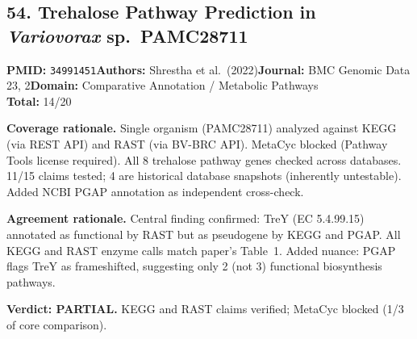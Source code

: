 \subsection{54. Trehalose Pathway Prediction in \textit{Variovorax} sp.\ PAMC28711}
\textbf{PMID:} \texttt{34991451}\quad\textbf{Authors:} Shrestha et al.\ (2022)\quad\textbf{Journal:} BMC Genomic Data 23, 2\quad\textbf{Domain:} Comparative Annotation / Metabolic Pathways\\
\quad{}\quad\textbf{Total:} 14/20\par\smallskip
\noindent\textbf{Coverage rationale.} Single organism (PAMC28711) analyzed against KEGG (via REST API) and RAST (via BV-BRC API). MetaCyc blocked (Pathway Tools license required). All 8 trehalose pathway genes checked across databases. 11/15 claims tested; 4 are historical database snapshots (inherently untestable). Added NCBI PGAP annotation as independent cross-check.\par
\noindent\textbf{Agreement rationale.} Central finding confirmed: TreY (EC 5.4.99.15) annotated as functional by RAST but as pseudogene by KEGG and PGAP. All KEGG and RAST enzyme calls match paper's Table~1. Added nuance: PGAP flags TreY as frameshifted, suggesting only 2 (not 3) functional biosynthesis pathways.\par\smallskip
\noindent\textbf{Verdict: PARTIAL.} KEGG and RAST claims verified; MetaCyc blocked (1/3 of core comparison).

